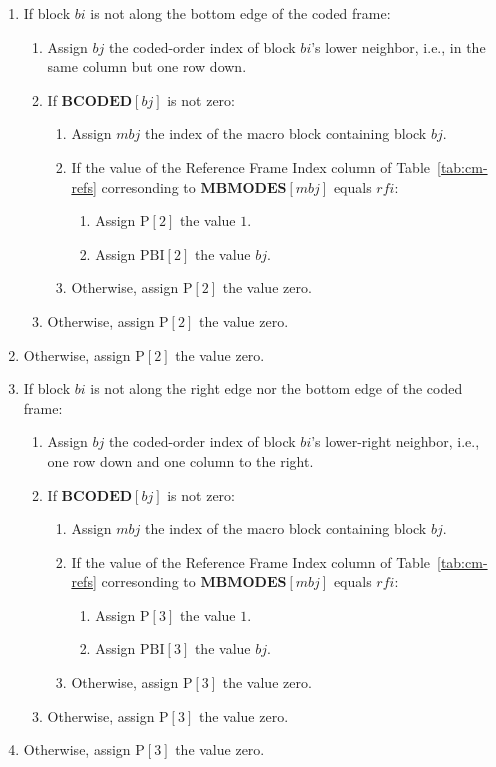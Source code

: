 \documentclass[9pt,letterpaper]{book}
\newcommand{\idx}[1]{{\ensuremath{\mathit{#1}}}}
\newcommand{\bi}{\idx{bi}}
\newcommand{\bj}{\idx{bj}}
\newcommand{\mbj}{\idx{mbj}}
\newcommand{\rfi}{\idx{rfi}}
\newcommand{\bitvar}[1]{\ensuremath{\mathbf{\bm{#1}}}}
\newcommand{\locvar}[1]{\ensuremath{\mathrm{#1}}}
\numberwithin{equation}{chapter}
\numberwithin{figure}{chapter}
\numberwithin{table}{chapter}
\begin{document}
\begin{enumerate}
\item
If block \bitvar{\bi} is not along the bottom edge of the coded frame:
\begin{enumerate}
\item
Assign \locvar{\bj} the coded-order index of block \bitvar{\bi}'s lower
 neighbor, i.e., in the same column but one row down.
\item
If $\bitvar{BCODED}[\bj]$ is not zero:
\begin{enumerate}
\item
Assign \locvar{\mbj} the index of the macro block containing block
 \locvar{\bj}.
\item
If the value of the Reference Frame Index column of Table~\ref{tab:cm-refs}
 corresonding to $\bitvar{MBMODES}[\locvar{\mbj}]$ equals \locvar{\rfi}:
\begin{enumerate}
\item
Assign $\locvar{P}[2]$ the value $1$.
\item
Assign $\locvar{PBI}[2]$ the value \locvar{\bj}.
\end{enumerate}
\item
Otherwise, assign $\locvar{P}[2]$ the value zero.
\end{enumerate}
\item
Otherwise, assign $\locvar{P}[2]$ the value zero.
\end{enumerate}
\item
Otherwise, assign $\locvar{P}[2]$ the value zero.

\item
If block \bitvar{\bi} is not along the right edge nor the bottom edge of the
 coded frame:
\begin{enumerate}
\item
Assign \locvar{\bj} the coded-order index of block \bitvar{\bi}'s lower-right
 neighbor, i.e., one row down and one column to the right.
\item
If $\bitvar{BCODED}[\bj]$ is not zero:
\begin{enumerate}
\item
Assign \locvar{\mbj} the index of the macro block containing block
 \locvar{\bj}.
\item
If the value of the Reference Frame Index column of Table~\ref{tab:cm-refs}
 corresonding to $\bitvar{MBMODES}[\locvar{\mbj}]$ equals \locvar{\rfi}:
\begin{enumerate}
\item
Assign $\locvar{P}[3]$ the value $1$.
\item
Assign $\locvar{PBI}[3]$ the value \locvar{\bj}.
\end{enumerate}
\item
Otherwise, assign $\locvar{P}[3]$ the value zero.
\end{enumerate}
\item
Otherwise, assign $\locvar{P}[3]$ the value zero.
\end{enumerate}
\item
Otherwise, assign $\locvar{P}[3]$ the value zero.


\end{enumerate}
\end{document}
